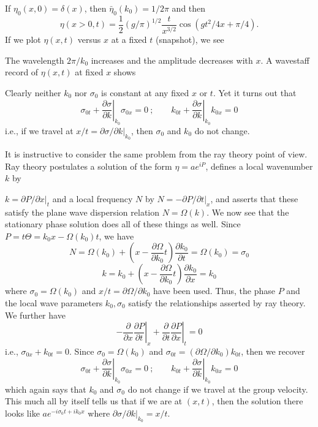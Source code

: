 If $\eta_0(x,0)=\delta(x)$, then $\bar\eta_0(k_0)=1/2\pi$ and then
\[
	\eta(x>0,t)=\frac12(g/\pi)^{1/2}\frac{t}{x^{3/2}}
	\cos(gt^2/4x+\pi/4).
\]
If we plot $\eta(x,t)$ versus $x$ at a fixed $t$ (snapshot), we see


The wavelength $2\pi/k_0$ increases and the amplitude decreases with $x$. A wavestaff
record of $\eta(x,t)$ at fixed $x$ shows


Clearly neither $k_0$ nor $\sigma_0$ is constant at any fixed $x$ or $t$. Yet it turns out that
\[
	\sigma_{0t}+\left.\frac{\partial\sigma}{\partial k}\right|_{k_0}\sigma_{0x}=0
	\ ;\qquad
	k_{0t}+\left.\frac{\partial\sigma}{\partial k}\right|_{k_0}k_{0x}=0
\]
i.e., if we travel at $x/t=\left.\partial\sigma/\partial k\right|_{k_0}$, then $\sigma_0$ and $k_0$ do not change.

It is instructive to consider the same problem from the ray theory point of view.
Ray theory postulates a solution of the form $\eta=ae^{iP}$, defines a local wavenumber $k$ by

\sourcepagebreak

$k=\left.\partial P/\partial x\right|_t$ and a local frequency $N$ by
$N=-\left.\partial P/\partial t\right|_x$, and asserts that these satisfy
the plane wave dispersion relation $N=\Omega(k)$. We now see that the stationary phase
solution does all of these things as well. Since $P=t\Theta=k_0x-\Omega(k_0)t$, we have
\[
	N=\Omega(k_0)+\left(x-\frac{\partial\Omega}{\partial k_0}t\right)
	\frac{\partial k_0}{\partial t}=\Omega(k_0)=\sigma_0
\]
\[
	k=k_0+\left(x-\frac{\partial\Omega}{\partial k_0}t\right)
	\frac{\partial k_0}{\partial x}=k_0
\]
where $\sigma_0=\Omega(k_0)$ and $x/t=\partial\Omega/\partial k_0$ have been used. Thus, the phase $P$ and the local
wave parameters $k_0,\sigma_0$ satisfy the relationships asserted by ray theory. We further
have
\[
	-\frac{\partial}{\partial x}\left.\frac{\partial P}{\partial t}\right|_x
	+\frac{\partial}{\partial t}\left.\frac{\partial P}{\partial x}\right|_t=0
\]
i.e., $\sigma_{0x}+k_{0t}=0$. Since $\sigma_0=\Omega(k_0)$ and
$\sigma_{0t}=(\partial\Omega/\partial k_0)k_{0t}$, then we recover
\[
	\sigma_{0t}+\left.\frac{\partial\sigma}{\partial k}\right|_{k_0}\sigma_{0x}=0
	\ ;\qquad
	k_{0t}+\left.\frac{\partial\sigma}{\partial k}\right|_{k_0}k_{0x}=0
\]
which again says that $k_0$ and $\sigma_0$ do not change if we travel at the group velocity. This
much all by itself tells us that if we are at $(x,t)$, then the solution there looks like
$ae^{-i\sigma_0t+ik_0x}$ where $\left.\partial\sigma/\partial k\right|_{k_0}=x/t$.

